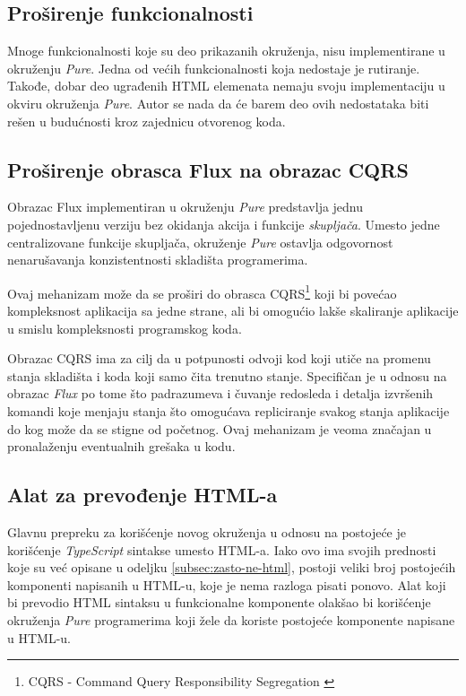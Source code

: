 \documentclass[12pt,oneside]{memoir}
\begin{document}
\subsection{Proširenje funkcionalnosti}
Mnoge funkcionalnosti koje su deo prikazanih okruženja, nisu implementirane u okruženju
\emph{Pure}. Jedna od većih funkcionalnosti koja nedostaje je rutiranje.
Takođe, dobar deo ugrađenih HTML elemenata
nemaju svoju implementaciju u okviru okruženja \emph{Pure}. Autor se nada da će barem deo
ovih nedostataka biti rešen u budućnosti kroz zajednicu otvorenog koda.

\subsection{Proširenje obrasca Flux na obrazac CQRS}
Obrazac Flux implementiran u okruženju \emph{Pure} predstavlja jednu
pojednostavljenu verziju bez okidanja akcija i funkcije
\emph{skupljača}. Umesto jedne centralizovane funkcije skupljača,
okruženje \emph{Pure} ostavlja odgovornost nenarušavanja
konzistentnosti skladišta programerima.

Ovaj mehanizam može da se proširi do obrasca CQRS\footnote{CQRS - Command Query Responsibility Segregation \cite{CQRS}} \cite{CQRS} koji bi povećao
kompleksnost aplikacija sa jedne strane, ali bi omogućio lakše
skaliranje aplikacije u smislu kompleksnosti programskog koda.

Obrazac CQRS ima za cilj da u potpunosti odvoji kod koji utiče na
promenu stanja skladišta i koda koji samo čita trenutno stanje.
Specifičan je u odnosu na obrazac \emph{Flux} po tome što padrazumeva i čuvanje redosleda i detalja izvršenih komandi koje menjaju stanja što omogućava repliciranje svakog stanja aplikacije
do kog može da se stigne od početnog. Ovaj mehanizam je veoma značajan u pronalaženju eventualnih grešaka u kodu.
\subsection{Alat za prevođenje HTML-a}
Glavnu prepreku za korišćenje novog okruženja u odnosu na postojeće je korišćenje \emph{TypeScript} sintakse umesto HTML-a. Iako ovo ima svojih prednosti koje su već opisane u odeljku \ref{subsec:zasto-ne-html}, postoji veliki broj postojećih komponenti
napisanih u HTML-u, koje je nema razloga pisati ponovo.
Alat koji bi prevodio HTML sintaksu u funkcionalne komponente olakšao bi korišćenje okruženja \emph{Pure} programerima koji žele da koriste postojeće komponente napisane u HTML-u.
\end{document}
